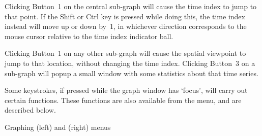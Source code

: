 Clicking Button~1 on the central sub-graph will cause the time index
to jump to that point.  If the Shift or Ctrl key is pressed while
doing this, the time index instead will move up or down by~1, in
whichever direction corresponds to the mouse cursor relative to
the time index indicator ball.

Clicking Button~1 on any other sub-graph
will cause the spatial viewpoint to jump to that location, without
changing the time index.  Clicking Button~3 on a sub-graph will popup
a small window with some statistics about that time series.

Some keystrokes, if pressed while the graph window has `focus',
will carry out certain functions.  These functions are also available from
the  menu, and are described below.
\vspace{2ex}\goodbreak\begin{samepage}
\centerline{\epsfxsize=5in}\vspace{1ex}
\centerline{\sf Graphing  (left) and  (right) menus}
\end{samepage}\goodbreak

\newcommand{\bitem}[1]{\item[\blob\button{#1}]}
\newcommand{\kq}[1]{`{\tt #1}'}


